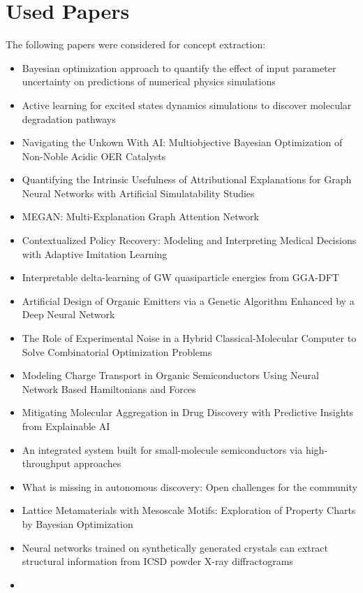\documentclass{article}%
\begin{document}
\section{Used Papers}%
\label{sec:UsedPapers}%
The following papers were considered for concept extraction:%
\begin{itemize}%
\item%
Bayesian optimization approach to quantify the effect of input parameter uncertainty on predictions of numerical physics simulations%
\item%
Active learning for excited states dynamics simulations to discover molecular degradation pathways%
\item%
Navigating the Unkown With AI: Multiobjective Bayesian Optimization of Non{-}Noble Acidic OER Catalysts%
\item%
Quantifying the Intrinsic Usefulness of Attributional Explanations for Graph Neural Networks with Artificial Simulatability Studies%
\item%
MEGAN: Multi{-}Explanation Graph Attention Network%
\item%
Contextualized Policy Recovery: Modeling and Interpreting Medical Decisions with Adaptive Imitation Learning%
\item%
Interpretable delta{-}learning of GW quasiparticle energies from GGA{-}DFT%
\item%
Artificial Design of Organic Emitters via a Genetic Algorithm Enhanced by a Deep Neural Network%
\item%
The Role of Experimental Noise in a Hybrid Classical{-}Molecular Computer to Solve Combinatorial Optimization Problems%
\item%
Modeling Charge Transport in Organic Semiconductors Using Neural Network Based Hamiltonians and Forces%
\item%
Mitigating Molecular Aggregation in Drug Discovery with Predictive Insights from Explainable AI%
\item%
An integrated system built for small{-}molecule semiconductors via high{-}throughput approaches%
\item%
What is missing in autonomous discovery: Open challenges for the community%
\item%
Lattice Metamaterials with Mesoscale Motifs: Exploration of Property Charts by Bayesian Optimization%
\item%
Neural networks trained on synthetically generated crystals can extract structural information from ICSD powder X{-}ray diffractograms%
\item%

\end{itemize}
\end{document}
